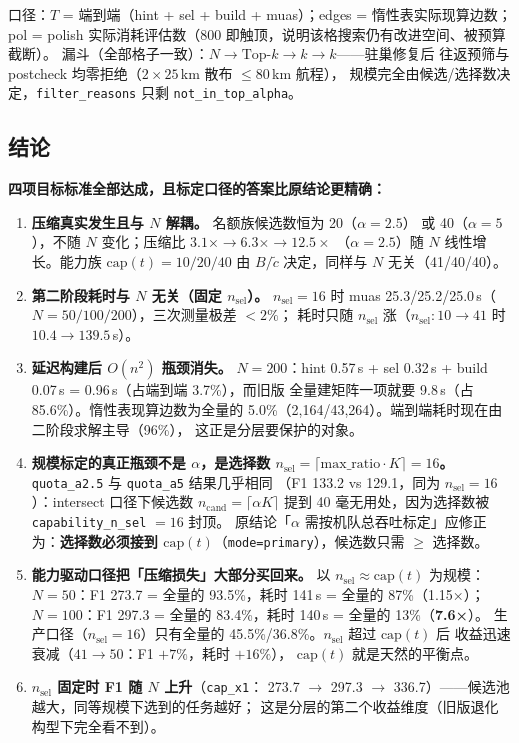 \documentclass[a4paper,11pt]{article}
\begin{document}
口径：$T$ = 端到端（hint + sel + build + muas）；edges = 惰性表实际现算边数；
pol = polish 实际消耗评估数（800 即触顶，说明该格搜索仍有改进空间、被预算截断）。
漏斗（全部格子一致）：$N \to \mathrm{Top}\text{-}k \to k \to k$——驻巢修复后
往返预筛与 postcheck 均零拒绝（$2 \times 25$\,km 散布 $\le 80$\,km 航程），
规模完全由候选/选择数决定，\texttt{filter\_reasons} 只剩 \texttt{not\_in\_top\_alpha}。

\subsection{结论}

\textbf{四项目标标准全部达成，且标定口径的答案比原结论更精确：}

\begin{enumerate}
  \item \textbf{压缩真实发生且与 $N$ 解耦。} 名额族候选数恒为 20（$\alpha = 2.5$）
        或 40（$\alpha = 5$），不随 $N$ 变化；压缩比 $3.1\times \to 6.3\times \to 12.5\times$
        （$\alpha = 2.5$）随 $N$ 线性增长。能力族 $\mathrm{cap}(t) = 10/20/40$
        由 $B/\tilde{c}$ 决定，同样与 $N$ 无关（41/40/40）。
  \item \textbf{第二阶段耗时与 $N$ 无关（固定 $n_{\mathrm{sel}}$）。} $n_{\mathrm{sel}} = 16$ 时 muas
        25.3/25.2/25.0\,s（$N = 50/100/200$），三次测量极差 $< 2\%$；
        耗时只随 $n_{\mathrm{sel}}$ 涨（$n_{\mathrm{sel}}: 10 \to 41$ 时 $10.4 \to 139.5$\,s）。
  \item \textbf{延迟构建后 $O(n^2)$ 瓶颈消失。} $N = 200$：hint 0.57\,s +
        sel 0.32\,s + build 0.07\,s = 0.96\,s（占端到端 3.7\%），而旧版
        全量建矩阵一项就要 9.8\,s（占 85.6\%）。惰性表现算边数为全量的
        5.0\%（2,164/43,264）。端到端耗时现在由二阶段求解主导（96\%），
        这正是分层要保护的对象。
  \item \textbf{规模标定的真正瓶颈不是 $\alpha$，是选择数
        $n_{\mathrm{sel}}=\lceil \mathrm{max\_ratio} \cdot K \rceil = 16$。}
        \texttt{quota\_a2.5} 与 \texttt{quota\_a5} 结果几乎相同
        （F1 133.2 vs 129.1，同为 $n_{\mathrm{sel}} = 16$）：intersect 口径下候选数
        $n_{\mathrm{cand}}=\lceil \alpha K \rceil$ 提到 40 毫无用处，因为选择数被
        \texttt{capability\_n\_sel} $= 16$ 封顶。
        原结论「$\alpha$ 需按机队总吞吐标定」应修正为：\textbf{选择数必须接到
        $\mathrm{cap}(t)$}（\texttt{mode=primary}），候选数只需 $\ge$ 选择数。
  \item \textbf{能力驱动口径把「压缩损失」大部分买回来。} 以 $n_{\mathrm{sel}} \approx \mathrm{cap}(t)$
        为规模：$N{=}50$：F1 273.7 = 全量的 93.5\%，耗时 141\,s = 全量的 87\%（1.15×）；
        $N{=}100$：F1 297.3 = 全量的 83.4\%，耗时 140\,s = 全量的 13\%（\textbf{7.6×}）。
        生产口径（$n_{\mathrm{sel}} = 16$）只有全量的 45.5\%/36.8\%。$n_{\mathrm{sel}}$ 超过 $\mathrm{cap}(t)$ 后
        收益迅速衰减（$41 \to 50$：F1 $+7\%$，耗时 $+16\%$），
        $\mathrm{cap}(t)$ 就是天然的平衡点。
  \item \textbf{$n_{\mathrm{sel}}$ 固定时 F1 随 $N$ 上升}（\texttt{cap\_x1}：
        273.7 $\to$ 297.3 $\to$ 336.7）——候选池越大，同等规模下选到的任务越好；
        这是分层的第二个收益维度（旧版退化构型下完全看不到）。
\end{enumerate}
\end{document}
